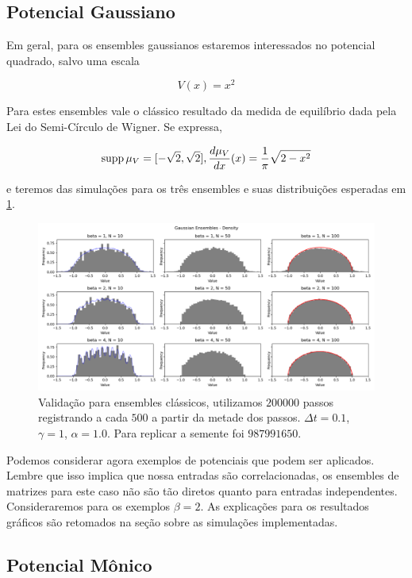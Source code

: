 \subsection{Potencial Gaussiano}

Em geral, para os ensembles gaussianos estaremos interessados no potencial quadrado, salvo uma escala

\[
	V(x) = x^2
\]

Para estes ensembles vale o clássico resultado da medida de equilíbrio dada pela Lei do Semi-Círculo de Wigner. Se expressa,

\[
\operatorname{supp} \mu_V = [-\sqrt{2}, \sqrt{2}], \frac{d \mu_V}{dx}(x) = \frac{1}{\pi} \sqrt{2 - x^2} 
\]

e teremos das simulações para os três ensembles e suas distribuições esperadas em \ref{fig: semicircle}.

\begin{figure}[ht]
	\centering
	\includegraphics[scale=0.45]{Assets/validationArticleAlg}
	\caption{Validação para ensembles clássicos, utilizamos $200000$ passos registrando a cada $500$ a partir da metade dos passos. $\Delta t = 0.1$, $\gamma = 1$, $\alpha = 1.0$. Para replicar a semente foi $987991650$.}
	\label{fig: semicircle}
\end{figure}

Podemos considerar agora exemplos de potenciais que podem ser aplicados. Lembre que isso implica que nossa entradas são correlacionadas, os ensembles de matrizes para este caso não são tão diretos quanto para entradas independentes. Consideraremos para os exemplos $\beta = 2$. As explicações para os resultados gráficos são retomados na seção sobre as simulações implementadas.


\subsection{Potencial Mônico}

